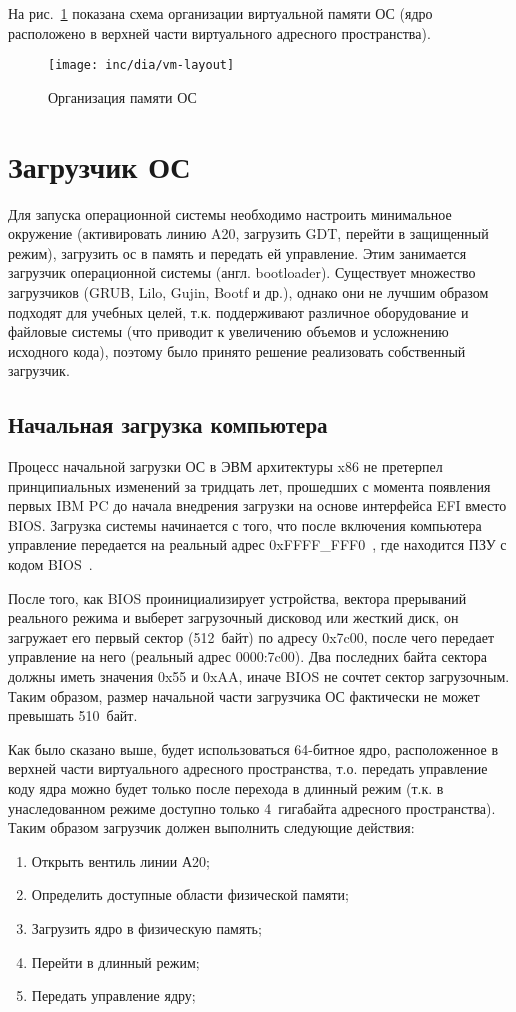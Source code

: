 На рис.~\ref{fig:vm-layout} показана схема организации виртуальной памяти ОС
(ядро расположено в верхней части виртуального адресного пространства).

\begin{figure}[ht!]
  \centering
  \texttt{[image: inc/dia/vm-layout]}
  \caption{Организация памяти ОС}
  \label{fig:vm-layout}
\end{figure}


\section{Загрузчик ОС}
Для запуска операционной системы необходимо настроить минимальное окружение (активировать линию A20,
загрузить GDT, перейти в защищенный режим), загрузить ос в память и передать ей управление.
Этим занимается загрузчик операционной системы (англ. bootloader). Существует множество загрузчиков
(GRUB, Lilo, Gujin, Bootf и др.), однако они не лучшим образом подходят для учебных целей, т.к. поддерживают
различное оборудование и файловые системы (что приводит к увеличению объемов и усложнению исходного кода),
поэтому было принято решение реализовать собственный загрузчик.

\subsection{Начальная загрузка компьютера}
Процесс начальной загрузки ОС в ЭВМ архитектуры x86 не претерпел
принципиальных изменений за тридцать лет, прошедших с момента появления
первых IBM PC до начала внедрения загрузки на основе интерфейса EFI вместо
BIOS. Загрузка системы начинается с того, что после включения компьютера
управление передается на реальный адрес 0xFFFF\_FFF0~\cite{amd_pm_v2}, где находится
ПЗУ с кодом BIOS~\cite{mstu_os_dev_method}.

После того, как BIOS проинициализирует устройства, вектора прерываний реального
режима и выберет загрузочный дисковод или жесткий диск, он загружает его
первый сектор (512~байт) по адресу 0x7c00, после чего передает управление на
него (реальный адрес 0000:7c00). Два последних байта сектора должны иметь
значения 0x55 и 0xAA, иначе BIOS не сочтет сектор загрузочным. Таким образом,
размер начальной части загрузчика ОС фактически не может превышать 510~байт.

Как было сказано выше, будет использоваться 64-битное ядро, расположенное в верхней части
виртуального адресного пространства, т.о. передать управление коду ядра можно будет
только после перехода в длинный режим (т.к. в унаследованном режиме доступно только 4~гигабайта
адресного пространства). Таким образом загрузчик должен выполнить следующие действия:
\begin{enumerate}[1.]
\item Открыть вентиль линии А20;
\item Определить доступные области физической памяти;
\item Загрузить ядро в физическую память;
\item Перейти в длинный режим;
\item Передать управление ядру;
\end{enumerate}

